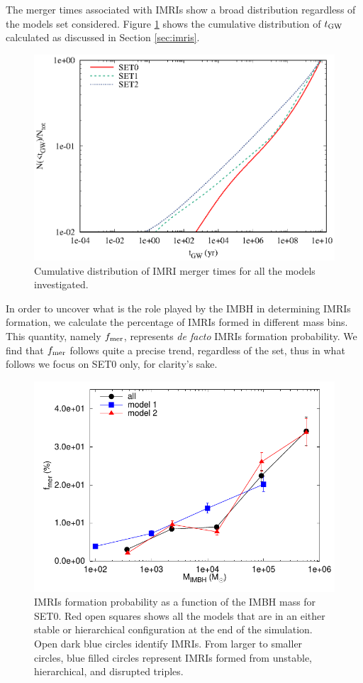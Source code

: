 \documentclass[twocolumn]{aastex62}
\newcommand{\gw}{{\rm GW}}
\begin{document}
The merger times associated with IMRIs show a broad distribution regardless of the models set considered. Figure \ref{fig:f6} shows the cumulative distribution of $t_\gw$ calculated as discussed in Section \ref{sec:imris}.

\begin{figure}
\centering
\includegraphics[width=\columnwidth]{TGW_distribution}
\caption{Cumulative distribution of IMRI merger times for all the models investigated.}
\label{fig:f6}
\end{figure}

In order to uncover what is the role played by the IMBH in determining IMRIs formation, we calculate the percentage of IMRIs formed in different mass bins. This quantity, namely $f_{\rm mer}$, represents {\it de facto} IMRIs formation probability. We find that $f_{\rm mer}$ follows quite a precise trend, regardless of the set, thus in what follows we focus on SET0 only, for clarity's sake.

\begin{figure}
	\centering
    \includegraphics[width=\columnwidth]{mergers}
	\caption{IMRIs formation probability as a function of the IMBH mass for SET0. Red open squares shows all the models that are in an either stable or hierarchical configuration at the end of the simulation. Open dark blue circles identify IMRIs. From larger to smaller circles, blue filled circles represent IMRIs formed from unstable, hierarchical, and disrupted triples.}
	\label{fig:f7}
\end{figure}
\end{document}
